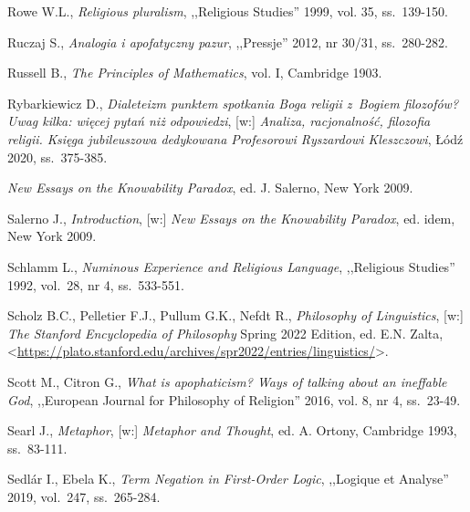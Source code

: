 \begin{thebibliography}{100}
Rowe W.L., \textit{Religious pluralism}, ,,Religious Studies'' 1999, vol. 35, ss.~139-150.

Ruczaj S., \textit{Analogia i apofatyczny pazur}, ,,Pressje'' 2012, nr 30/31, ss.~280-282.

Russell B., \textit{The Principles of Mathematics}, vol. I, Cambridge 1903.


Rybarkiewicz D., \textit{Dialeteizm punktem spotkania Boga religii z~Bogiem filozofów? Uwag kilka: więcej pytań niż odpowiedzi},
[w:] \textit{Analiza, racjonalność, filozofia religii. Księga jubileuszowa dedykowana Profesorowi Ryszardowi Kleszczowi}, Łódź 2020, ss.~375-385.

\textit{New Essays on the Knowability Paradox}, ed. J. Salerno, New York 2009.

Salerno J., \textit{Introduction}, [w:] \textit{New Essays on the Knowability Paradox}, ed. idem, New York 2009.

Schlamm L., \textit{Numinous Experience and Religious Language}, ,,Religious Studies'' 1992, vol.~28, nr 4, ss.~533-551.

Scholz B.C., Pelletier F.J., Pullum G.K., Nefdt R., \textit{Philosophy of Linguistics}, [w:] \textit{The Stanford Encyclopedia of Philosophy}
Spring 2022 Edition, ed. E.N. Zalta, <\url{https://plato.stanford.edu/archives/spr2022/entries/linguistics/}>.


Scott M., Citron G., \textit{What is apophaticism? Ways of talking about an ineffable God}, ,,European Journal for Philosophy of Religion'' 2016, vol. 8, nr 4, ss.~23-49.

Searl J., \textit{Metaphor}, [w:] \textit{Metaphor and Thought}, ed. A. Ortony, Cambridge 1993, ss.~83-111.

Sedlár I., Ebela K., \textit{Term Negation in First-Order Logic}, ,,Logique et Analyse'' 2019, vol.~247, ss.~265-284.


\end{thebibliography}
